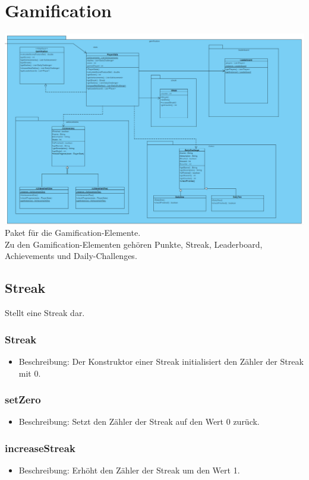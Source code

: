 \documentclass[a4paper]{scrreprt}
\begin{document}
	\section{Gamification}
	\includegraphics[width=\textwidth]{img/Gamification.PNG}\\
	Paket für die Gamification-Elemente. \\
	Zu den Gamification-Elementen gehören Punkte, Streak, Leaderboard, Achievements und Daily-Challenges.


	\subsection{Streak}
	Stellt eine Streak dar.

	\subsubsection{Streak}
	\begin{itemize}
		\item Beschreibung: Der Konstruktor einer Streak initialisiert den Zähler der Streak mit 0.
	\end{itemize}
	\subsubsection{setZero}
	\begin{itemize}
		\item Beschreibung: Setzt den Zähler der Streak auf den Wert 0 zurück.
	\end{itemize}
	\subsubsection{increaseStreak}
	\begin{itemize}
		\item Beschreibung: Erhöht den Zähler der Streak um den Wert 1.
	\end{itemize}
\end{document}
